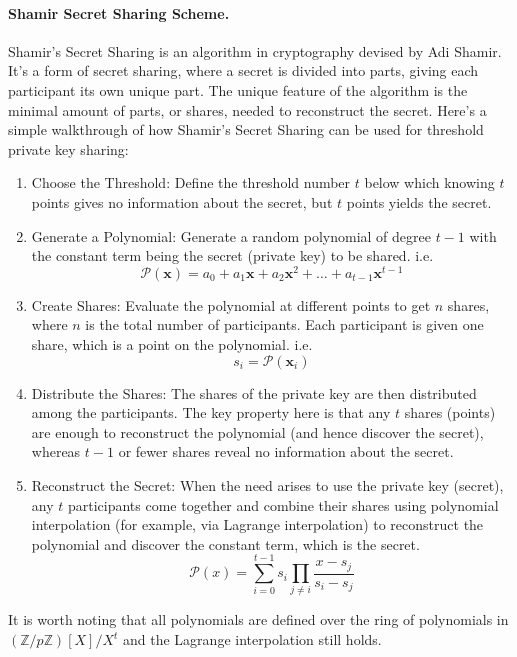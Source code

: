 \documentclass[11pt]{article}
\begin{document}
\paragraph{Shamir Secret Sharing Scheme.}
Shamir's Secret Sharing is an algorithm in cryptography devised by Adi Shamir. It's a form of secret sharing, where a secret is divided into parts, giving each participant its own unique part. The unique feature of the algorithm is the minimal amount of parts, or shares, needed to reconstruct the secret.
Here's a simple walkthrough of how Shamir's Secret Sharing can be used for threshold private key sharing:
\begin{enumerate}
\item Choose the Threshold: Define the threshold number $t$ below which knowing $t$ points gives no information about the secret, but $t$ points yields the secret.
\item Generate a Polynomial: Generate a random polynomial of degree $t-1$ with the constant term being the secret (private key) to be shared. i.e. \begin{equation}\mathcal{P}(\mathbf{x})=a_0+a_1\mathbf{x}+a_2\mathbf{x}^2+\ldots+a_{t-1}\mathbf{x}^{t-1}
\end{equation}
\item Create Shares: Evaluate the polynomial at different points to get $n$ shares, where $n$ is the total number of participants. Each participant is given one share, which is a point on the polynomial. i.e. \begin{equation}s_i=\mathcal{P}(\mathbf{x}_i)\end{equation}
\item Distribute the Shares: The shares of the private key are then distributed among the participants.
The key property here is that any $t$ shares (points) are enough to reconstruct the polynomial (and hence discover the secret), whereas $t-1$ or fewer shares reveal no information about the secret.
\item Reconstruct the Secret: When the need arises to use the private key (secret), any $t$ participants come together and combine their shares using polynomial interpolation (for example, via Lagrange interpolation) to reconstruct the polynomial and discover the constant term, which is the secret.
\begin{equation}
\mathcal{P}(x)=\sum^{t-1}_{i=0}s_i\prod_{j\neq i}\frac{x-s_j}{s_i-s_j}
\end{equation}

\end{enumerate}
It is worth noting that all polynomials are defined over the ring of polynomials in $(\mathbb{Z}/p\mathbb{Z})[X]/X^{t}$ and the Lagrange interpolation still holds.
\end{document}
